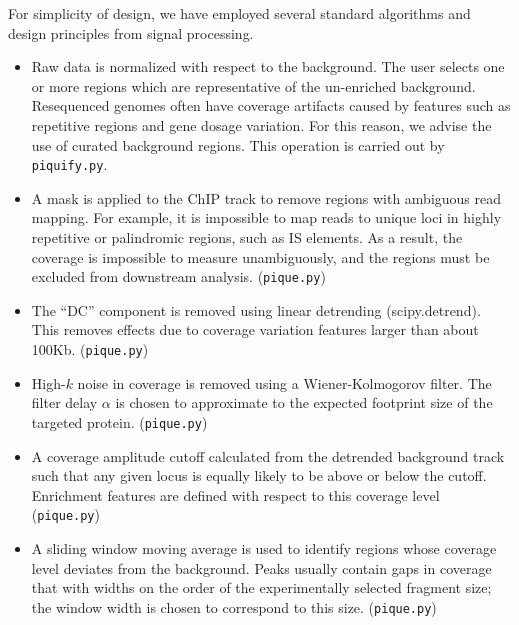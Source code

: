 \documentclass{article}
\begin{document}
For simplicity of design, we have employed several standard algorithms
and design principles from signal processing.

\begin{itemize}

\item Raw data is normalized with respect to the background. The user
  selects one or more regions which are representative of the
  un-enriched background. Resequenced genomes often have coverage
  artifacts caused by features such as repetitive regions and gene
  dosage variation. For this reason, we advise the use of curated
  background regions. This operation is carried out by
  \texttt{piquify.py}.

\item A mask is applied to the ChIP track to remove regions with
  ambiguous read mapping. For example, it is impossible to map reads
  to unique loci in highly repetitive or palindromic regions, such as
  IS elements. As a result, the coverage is impossible to measure
  unambiguously, and the regions must be excluded from downstream
  analysis. (\texttt{pique.py})

\item The ``DC'' component is removed using linear detrending
  (scipy.detrend). This removes effects due to coverage variation
  features larger than about 100Kb. (\texttt{pique.py})

\item High-$k$ noise in coverage is removed using a Wiener-Kolmogorov
  filter. The filter delay $\alpha$ is chosen to approximate to the
  expected footprint size of the targeted protein. (\texttt{pique.py})

\item A coverage amplitude cutoff calculated from the detrended
  background track such that any given locus is equally likely to be
  above or below the cutoff. Enrichment features are defined with
  respect to this coverage level (\texttt{pique.py})

\item A sliding window moving average is used to identify regions
  whose coverage level deviates from the background. Peaks usually
  contain gaps in coverage that with widths on the order of the
  experimentally selected fragment size; the window width is chosen to
  correspond to this size. (\texttt{pique.py})



\end{itemize}
\end{document}
